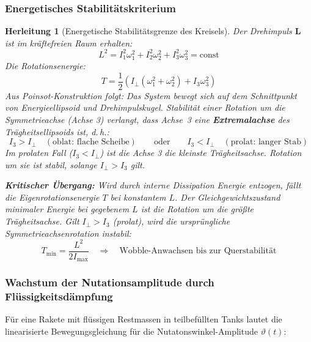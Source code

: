 ﻿\documentclass[12pt,a4paper]{article}
\newtheorem{herleitung}{Herleitung}[section]
\newcommand{\vek}[1]{\boldsymbol{#1}}
\begin{document}
\subsubsection{Energetisches Stabilitätskriterium}

\begin{herleitung}[Energetische Stabilitätsgrenze des Kreisels]
Der Drehimpuls $\vek{L}$ ist im kräftefreien Raum erhalten:
\[
  L^2 = I_1^2\omega_1^2 + I_2^2\omega_2^2 + I_3^2\omega_3^2 = \mathrm{const}
\]
Die Rotationsenergie:
\[
  T = \frac{1}{2}\left(I_\perp(\omega_1^2+\omega_2^2) + I_3\omega_3^2\right)
\]
Aus Poinsot-Konstruktion folgt: Das System bewegt sich auf dem Schnittpunkt von
Energieellipsoid und Drehimpulskugel. Stabilität einer Rotation um die
Symmetrieachse (Achse 3) verlangt, dass Achse~3 eine \textbf{Extremalachse}
des Trägheitsellipsoids ist, d.\,h.:
\[
  I_3 > I_\perp \quad (\text{oblat: flache Scheibe})
  \qquad\text{oder}\qquad
  I_3 < I_\perp \quad (\text{prolat: langer Stab})
\]
Im prolaten Fall ($I_3 < I_\perp$) ist die Achse 3 die \emph{kleinste} Trägheitsachse.
Rotation um sie ist stabil, solange $I_\perp > I_3$ gilt.

\textbf{Kritischer Übergang:} Wird durch interne Dissipation Energie entzogen, fällt
die Eigenrotationsenergie $T$ bei konstantem $L$. Der Gleichgewichtszustand minimaler
Energie bei gegebenem $L$ ist die Rotation um die \emph{größte} Trägheitsachse. Gilt
$I_\perp > I_3$ (prolat), wird die ursprüngliche Symmetrieachsenrotation instabil:
\[
  T_{\min} = \frac{L^2}{2I_{\max}} \quad\Rightarrow\quad
  \text{Wobble-Anwachsen bis zur Querstabilität}
\]
\end{herleitung}

\subsubsection{Wachstum der Nutationsamplitude durch Flüssigkeitsdämpfung}

Für eine Rakete mit flüssigen Restmassen in teilbefüllten Tanks lautet die
linearisierte Bewegungsgleichung für die Nutatonswinkel-Amplitude $\vartheta(t)$:
\end{document}
